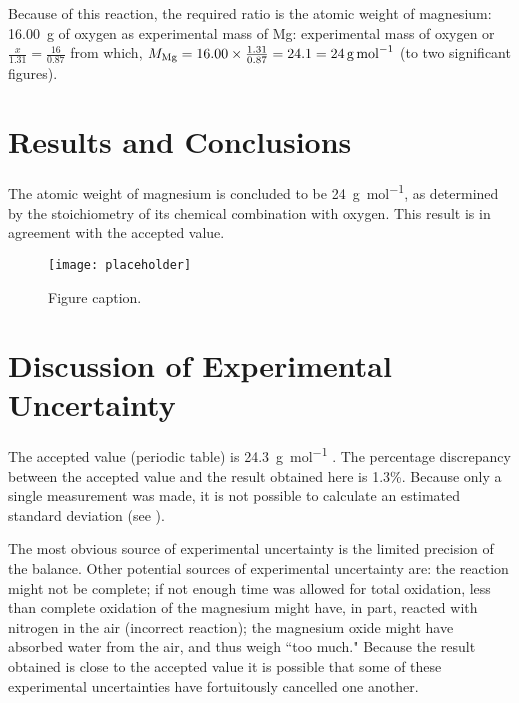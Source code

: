 \documentclass[
	a4paper, %
	12pt, %
]{CSUniSchoolLabReport}
\begin{document}
Because of this reaction, the required ratio is the atomic weight of magnesium: \SI{16.00}{\gram} of oxygen as experimental mass of Mg: experimental mass of oxygen or $\frac{x}{1.31} = \frac{16}{0.87}$ from which, $M_{\ce{Mg}} = 16.00 \times \frac{1.31}{0.87} = 24.1 = \SI{24}{\gram\per\mole}$ (to two significant figures).


\section{Results and Conclusions}

The atomic weight of magnesium is concluded to be \SI{24}{\gram\per\mol}, as determined by the stoichiometry of its chemical combination with oxygen. This result is in agreement with the accepted value.

\begin{figure}[H] %
	\centering %
	\texttt{[image: placeholder]} %
	\caption{Figure caption.}
\end{figure}


\section{Discussion of Experimental Uncertainty}

The accepted value (periodic table) is \SI{24.3}{\gram\per\mole} \autocite{Smith:2022qr}. The percentage discrepancy between the accepted value and the result obtained here is 1.3\%. Because only a single measurement was made, it is not possible to calculate an estimated standard deviation (see \textcite{Smith:2021jd}).

The most obvious source of experimental uncertainty is the limited precision of the balance. Other potential sources of experimental uncertainty are: the reaction might not be complete; if not enough time was allowed for total oxidation, less than complete oxidation of the magnesium might have, in part, reacted with nitrogen in the air (incorrect reaction); the magnesium oxide might have absorbed water from the air, and thus weigh ``too much." Because the result obtained is close to the accepted value it is possible that some of these experimental uncertainties have fortuitously cancelled one another.
\end{document}
